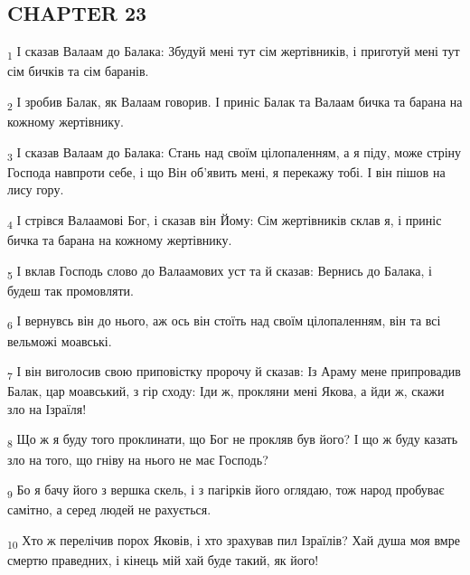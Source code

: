 \subsection{CHAPTER 23}
\begin{tcolorbox}
\textsubscript{1} І сказав Валаам до Балака: Збудуй мені тут сім жертівників, і приготуй мені тут сім бичків та сім баранів.
\end{tcolorbox}
\begin{tcolorbox}
\textsubscript{2} І зробив Балак, як Валаам говорив. І приніс Балак та Валаам бичка та барана на кожному жертівнику.
\end{tcolorbox}
\begin{tcolorbox}
\textsubscript{3} І сказав Валаам до Балака: Стань над своїм цілопаленням, а я піду, може стріну Господа навпроти себе, і що Він об'явить мені, я перекажу тобі. І він пішов на лису гору.
\end{tcolorbox}
\begin{tcolorbox}
\textsubscript{4} І стрівся Валаамові Бог, і сказав він Йому: Сім жертівників склав я, і приніс бичка та барана на кожному жертівнику.
\end{tcolorbox}
\begin{tcolorbox}
\textsubscript{5} І вклав Господь слово до Валаамових уст та й сказав: Вернись до Балака, і будеш так промовляти.
\end{tcolorbox}
\begin{tcolorbox}
\textsubscript{6} І вернувсь він до нього, аж ось він стоїть над своїм цілопаленням, він та всі вельможі моавські.
\end{tcolorbox}
\begin{tcolorbox}
\textsubscript{7} І він виголосив свою приповістку пророчу й сказав: Із Араму мене припровадив Балак, цар моавський, з гір сходу: Іди ж, прокляни мені Якова, а йди ж, скажи зло на Ізраїля!
\end{tcolorbox}
\begin{tcolorbox}
\textsubscript{8} Що ж я буду того проклинати, що Бог не прокляв був його? І що ж буду казать зло на того, що гніву на нього не має Господь?
\end{tcolorbox}
\begin{tcolorbox}
\textsubscript{9} Бо я бачу його з вершка скель, і з пагірків його оглядаю, тож народ пробуває самітно, а серед людей не рахується.
\end{tcolorbox}
\begin{tcolorbox}
\textsubscript{10} Хто ж перелічив порох Яковів, і хто зрахував пил Ізраїлів? Хай душа моя вмре смертю праведних, і кінець мій хай буде такий, як його!
\end{tcolorbox}
